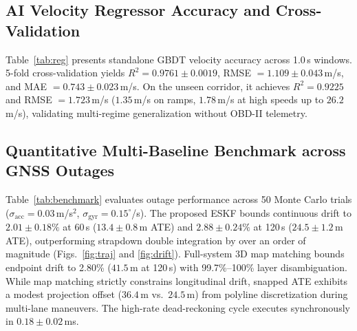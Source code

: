 \documentclass[conference]{IEEEtran}
\begin{document}
\subsection{AI Velocity Regressor Accuracy and Cross-Validation}
Table~\ref{tab:reg} presents standalone GBDT velocity accuracy across 1.0\,s windows. 5-fold cross-validation yields $R^2 = 0.9761 \pm 0.0019$, RMSE $= 1.109 \pm 0.043$\,m/s, and MAE $= 0.743 \pm 0.023$\,m/s. On the unseen corridor, it achieves $R^2 = 0.9225$ and RMSE $= 1.723$\,m/s ($1.35$\,m/s on ramps, $1.78$\,m/s at high speeds up to $26.2$\,m/s), validating multi-regime generalization without OBD-II telemetry.

\begin{table}[!htbp]
\centering
\caption{AI Velocity Regressor Cross-Validation and Test Performance}
\label{tab:reg}
\scriptsize
\renewcommand{\arraystretch}{0.95}
\setlength{\tabcolsep}{3pt}
\end{table}

\subsection{Quantitative Multi-Baseline Benchmark across GNSS Outages}
Table~\ref{tab:benchmark} evaluates outage performance across 50 Monte Carlo trials ($\sigma_{\text{acc}} = 0.03$\,m/s$^2$, $\sigma_{\text{gyr}} = 0.15^\circ$/s). The proposed ESKF bounds continuous drift to $2.01 \pm 0.18\%$ at 60\,s ($13.4 \pm 0.8$\,m ATE) and $2.88 \pm 0.24\%$ at 120\,s ($24.5 \pm 1.2$\,m ATE), outperforming strapdown double integration by over an order of magnitude (Figs.~\ref{fig:traj} and \ref{fig:drift}). Full-system 3D map matching bounds endpoint drift to 2.80\% ($41.5$\,m at 120\,s) with 99.7\%--100\% layer disambiguation. While map matching strictly constrains longitudinal drift, snapped ATE exhibits a modest projection offset ($36.4$\,m vs.\ $24.5$\,m) from polyline discretization during multi-lane maneuvers. The high-rate dead-reckoning cycle executes synchronously in $0.18 \pm 0.02$\,ms.
\end{document}
